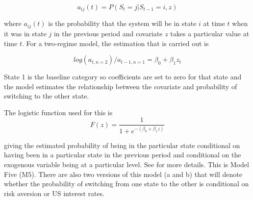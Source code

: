 \documentclass[12pt, a4paper, oneside]{article}\usepackage[]{graphicx}\usepackage[]{color}
\begin{document}
\begin{equation}
a_{ij}(t) = P(S_t = j|S_{t-1} = i, z)
\end{equation}

where $a_{ij}(t)$ is the probability that the system will be in state $i$ at time $t$ when it was in state $j$ in the previous period and  covariate $z$ takes a particular value at time $t$.  For a two-regime model, the  estimation that is carried out is 

\begin{equation}
log(a_{t,n = 2})/ a_{t-1, n = 1} = \beta_{0} +\beta_1 z_t 
\end{equation}

State 1 is the baseline category so coefficients are set to zero for that state and the model estimates the relationship between the covariate and probability of switching to the other state. 

The logistic function used for this is 
\begin{equation} 
F(z)  = \frac{1}{1 + e^{-(\beta_0 + \beta_1 z)}}
\label{eqref:zcov}
\end{equation}
 
giving the estimated probability of being in the particular state conditional on having been in a particular state in the previous period and conditional on the exogenous variable being at a particular level.  See \citet[pp.174-75]{agresti2014categorical} for more details.  This is Model Five (M5). There are also two versions of this model (a and b) that will denote whether the probability of switching from one state to the other is conditional on risk aversion or US interest rates. 
\end{document}
